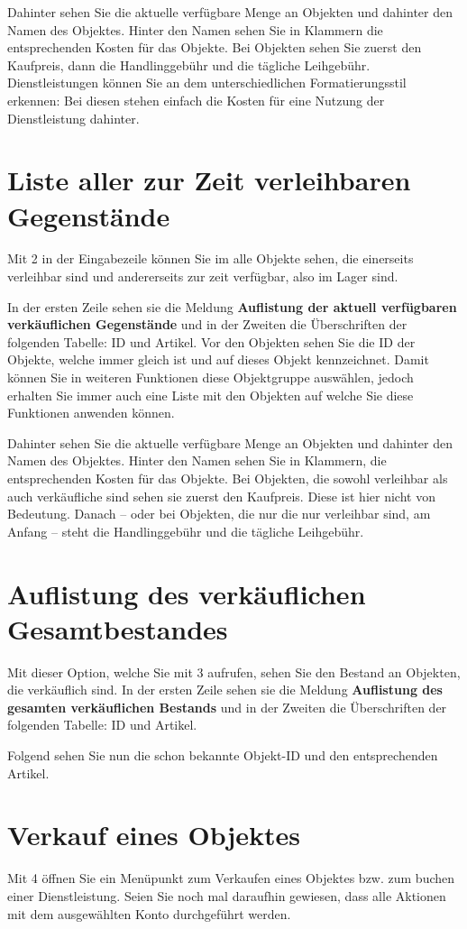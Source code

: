 ﻿\documentclass[a4paper,12pt,titlepage]{article}
\newcommand\enquote[1]{{\ttfamily \bfseries #1}}
\begin{document}
Dahinter sehen Sie die aktuelle verfügbare Menge an Objekten und dahinter den Namen des Objektes.
Hinter den Namen sehen Sie in Klammern die entsprechenden Kosten für das Objekte.
Bei Objekten sehen Sie zuerst den Kaufpreis, dann die Handlinggebühr und die tägliche Leihgebühr.
Dienstleistungen können Sie an dem unterschiedlichen Formatierungsstil erkennen:
Bei diesen stehen einfach die Kosten für eine Nutzung der Dienstleistung dahinter.

\section{Liste aller zur Zeit verleihbaren Gegenstände}
Mit 2 in der Eingabezeile können Sie im alle Objekte sehen,
 die einerseits verleihbar sind und andererseits zur zeit verfügbar, also im Lager sind.

In der ersten Zeile sehen sie die Meldung \enquote{Auflistung der aktuell verfügbaren verkäuflichen Gegenstände}
 und in der Zweiten die Überschriften der folgenden Tabelle: ID und Artikel.
Vor den Objekten sehen Sie die ID der Objekte, welche immer gleich ist und auf dieses Objekt kennzeichnet.
Damit können Sie in weiteren Funktionen diese Objektgruppe auswählen,
 jedoch erhalten Sie immer auch eine Liste mit den Objekten auf welche Sie diese Funktionen anwenden können.

Dahinter sehen Sie die aktuelle verfügbare Menge an Objekten und dahinter den Namen des Objektes.
Hinter den Namen sehen Sie in Klammern, die entsprechenden Kosten für das Objekte.
Bei Objekten, die sowohl verleihbar als auch verkäufliche sind sehen sie zuerst den Kaufpreis.
Diese ist hier nicht von Bedeutung.
Danach -- oder bei Objekten, die nur die nur verleihbar sind, am Anfang --
steht die Handlinggebühr und die tägliche Leihgebühr.

\section{Auflistung des verkäuflichen Gesamtbestandes}
Mit dieser Option, welche Sie mit 3 aufrufen, sehen Sie den Bestand an Objekten, die verkäuflich sind.
In der ersten Zeile sehen sie die Meldung \enquote{Auflistung des gesamten verkäuflichen Bestands}
 und in der Zweiten die Überschriften der folgenden Tabelle: ID und Artikel.

Folgend sehen Sie nun die schon bekannte Objekt-ID und den entsprechenden Artikel.

\section{Verkauf eines Objektes}
Mit 4 öffnen Sie ein Menüpunkt zum Verkaufen eines Objektes bzw. zum buchen einer Dienstleistung.
Seien Sie noch mal daraufhin gewiesen, dass alle Aktionen mit dem ausgewählten Konto durchgeführt werden.
\end{document}
